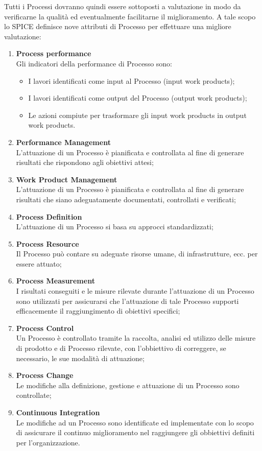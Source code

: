 Tutti i Processi dovranno quindi essere sottoposti a valutazione in modo da verificarne la qualità ed eventualmente facilitarne il miglioramento. A tale scopo lo SPICE definisce nove attributi di Processo per effettuare una migliore valutazione:
\begin{enumerate}
\item \textbf{Process performance}\\
Gli indicatori della performance di Processo sono:
\begin{itemize} 
\item I lavori identificati come input al Processo (input work products);
\item I lavori identificati come output del Processo (output work products);
\item Le azioni compiute per trasformare gli input work products in output work products.
\end{itemize}

\item \textbf{Performance Management}\\
L’attuazione di un Processo è pianificata e controllata al fine di generare risultati che rispondono agli obiettivi attesi;
\item \textbf{Work Product Management}\\
L’attuazione di un Processo è pianificata e controllata al fine di generare risultati che siano adeguatamente documentati, controllati e verificati;
\item \textbf{Process Definition}\\
L’attuazione di un Processo si basa su approcci standardizzati;
\item \textbf{Process Resource}\\
Il Processo può contare su adeguate risorse umane, di infrastrutture, ecc. per essere attuato;
\item \textbf{Process Measurement}\\
I risultati conseguiti e le misure rilevate durante l’attuazione di un Processo sono utilizzati per assicurarsi che l’attuazione di tale Processo supporti efficacemente il raggiungimento di obiettivi specifici;
\item \textbf{Process Control}\\
Un Processo è controllato tramite la raccolta, analisi ed utilizzo delle misure di prodotto e di Processo rilevate, con l’obbiettivo di correggere, se necessario, le sue modalità di attuazione;
\item \textbf{Process Change}\\
Le modifiche alla definizione, gestione e attuazione di un Processo sono controllate;
\item \textbf{Continuous Integration}\\
Le modifiche ad un Processo sono identificate ed implementate con lo scopo di assicurare il continuo miglioramento nel raggiungere gli obbiettivi definiti per l’organizzazione.
\end{enumerate}	
